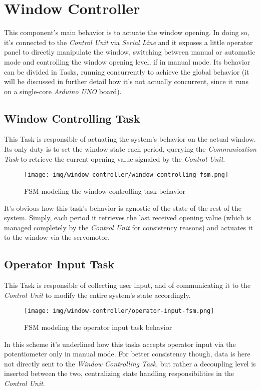\documentclass[a4paper,12pt]{report}
\begin{document}
	\section{Window Controller}
	This component's main behavior is to actuate the window opening. In doing so, it's connected to the \textit{Control Unit} via \textit{Serial Line} and it exposes a little operator panel to directly manipulate the window, switching between manual or automatic mode and controlling the window opening level, if in manual mode. Its behavior can be divided in Tasks, running concurrently to achieve the global behavior (it will be discussed in further detail how it's not actually concurrent, since it runs on a single-core \textit{Arduino UNO} board).
		\subsection{Window Controlling Task}
		This Task is responsible of actuating the system's behavior on the actual window. Its only duty is to set the window state each period, querying the \textit{Communication Task} to retrieve the current opening value signaled by the \textit{Control Unit}.
		\begin{figure}[H]
			\centering{}
			\texttt{[image: img/window-controller/window-controlling-fsm.png]}
			\caption{FSM modeling the window controlling task behavior}
			\label{img:window-controller/window-controlling-fsm}
		\end{figure}
		It's obvious how this task's behavior is agnostic of the state of the rest of the system. Simply, each period it retrieves the last received opening value (which is managed completely by the \textit{Control Unit} for consistency reasons) and actuates it to the window via the servomotor.
		\subsection{Operator Input Task}
		This Task is responsible of collecting user input, and of communicating it to the \textit{Control Unit} to modify the entire system's state accordingly.
		\begin{figure}[H]
			\centering{}
			\texttt{[image: img/window-controller/operator-input-fsm.png]}
			\caption{FSM modeling the operator input task behavior}
			\label{img:window-controller/operator-input-fsm}
		\end{figure}
		In this scheme it's underlined how this tasks accepts operator input via the potentiometer only in manual mode. For better consistency though, data is here not directly sent to the \textit{Window Controlling Task}, but rather a decoupling level is inserted between the two, centralizing state handling responsibilities in the \textit{Control Unit}.
\end{document}
